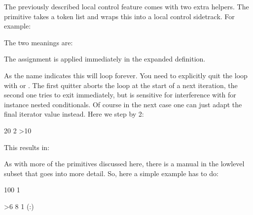 \stopnewprimitive

\startnewprimitive[title={\prm {localcontrolled}}]

The previously described local control feature comes with two extra helpers. The
 primitive takes a token list and wraps this into a local
control sidetrack. For example:

\startbuffer
\edef\testa{\scratchcounter123 \the\scratchcounter}
\edef\testb{\localcontrolled{\scratchcounter123}\the\scratchcounter}
\stopbuffer

\typebuffer

The two meanings are:

\start \getbuffer
\starttabulate[|T|T|]
\NC \string\testa \NC \meaningfull\testa \NC \NR
\NC \string\testb \NC \meaningfull\testb \NC \NR
\stoptabulate
\stop

The assignment is applied immediately in the expanded definition.

\stopnewprimitive

\startnewprimitive[title={\prm {localcontrolledendless}}]

As the name indicates this will loop forever. You need to explicitly quit the
loop with  or . The first quitter aborts the
loop at the start of a next iteration, the second one tries to exit immediately,
but is sensitive for interference with for instance nested conditionals. Of
course in the next case one can just adapt the final iterator value instead. Here
we step by 2:

\startbuffer
{} 20 2 {%
    \ifnum\currentloopiterator>10
        \quitloop
    \else
        [!]
    \fi
}
\stopbuffer

\typebuffer

This results in:

\getbuffer

\stopnewprimitive

\startnewprimitive[title={\prm {localcontrolledloop}}]

As with more of the primitives discussed here, there is a manual in the \quote
{lowlevel} subset that goes into more detail. So, here a simple example has to
do:

\startbuffer
{} 100 1 {%
    \ifnum\currentloopiterator>6\relax
        \quitloop
    \else
        [\number\currentloopnesting:\number\currentloopiterator]
         8 1 {%
            (\number\currentloopnesting:\number\currentloopiterator)
        }\par
    \fi
}
\stopbuffer

